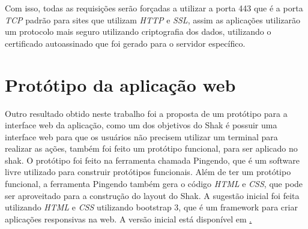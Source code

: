 Com isso, todas as requisições serão forçadas a utilizar a porta 443 que é a porta
\textit{TCP} padrão para sites que utilizam \textit{HTTP} e \textit{SSL}, assim as aplicações utilizarão
um protocolo mais seguro utilizando criptografia dos dados, utilizando o
certificado autoassinado que foi gerado para o servidor específico.

\section{Protótipo da aplicação web}
\label{sub:prototipo}

Outro resultado obtido neste trabalho foi a proposta de um protótipo para a interface
web da aplicação, como um dos objetivos do Shak é possuir uma interface web para que
os usuários não precisem utilizar um terminal para realizar as ações, também foi
feito um protótipo funcional, para ser aplicado no shak. O protótipo foi feito
na ferramenta chamada Pingendo, que é um software livre utilizado para construir
protótipos funcionais. Além de ter um protótipo funcional, a ferramenta Pingendo
também gera o código \textit{HTML} e \textit{CSS}, que pode ser aproveitado para 
a construção do layout do Shak. A sugestão inicial foi feita utilizando \textit{HTML} e \textit{CSS} utilizando
bootstrap 3, que é um framework para criar aplicações responsivas na web. A versão
inicial está disponível em \href{https://gitlab.com/Thiagovsk/shak_frontend/tree/master}.


